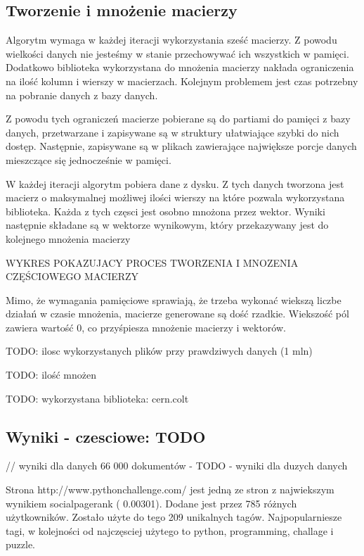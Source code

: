 \subsection{Tworzenie i mnożenie macierzy}

Algorytm wymaga w każdej iteracji wykorzystania sześć macierzy. Z powodu wielkości danych nie jesteśmy w stanie przechowywać ich wszystkich w pamięci. Dodatkowo biblioteka wykorzystana do mnożenia macierzy nakłada ograniczenia na ilość kolumn i wierszy w macierzach. Kolejnym problemem jest czas potrzebny na pobranie danych z bazy danych.

Z powodu tych ograniczeń macierze pobierane są do partiami do pamięci z bazy danych, przetwarzane i zapisywane są w struktury ułatwiające szybki do nich dostęp. Następnie, zapisywane są w plikach zawierające największe porcje danych mieszczące się jednocześnie w pamięci.

W każdej iteracji algorytm pobiera dane z dysku. Z tych danych tworzona jest macierz o maksymalnej możliwej ilości wierszy na które pozwala wykorzystana biblioteka. Każda z tych częsci jest osobno mnożona przez wektor. Wyniki następnie składane są w wektorze wynikowym, który przekazywany jest do kolejnego mnożenia macierzy

WYKRES POKAZUJACY PROCES TWORZENIA I MNOZENIA CZĘŚCIOWEGO MACIERZY



Mimo, że wymagania pamięciowe sprawiają, że trzeba wykonać wiekszą liczbe działań w czasie mnożenia, macierze generowane są dość rzadkie. Wiekszość pól zawiera wartość 0, co przyśpiesza mnożenie macierzy i wektorów.

TODO: ilosc wykorzystanych plików przy prawdziwych danych (1 mln)

TODO: ilość mnożen 

TODO: wykorzystana biblioteka: cern.colt


\subsection{Wyniki - czesciowe: TODO}

// wyniki dla danych 66 000 dokumentów - TODO - wyniki dla duzych danych

Strona http://www.pythonchallenge.com/ jest jedną ze stron z najwiekszym wynikiem socialpagerank ( 0.00301). Dodane jest przez 785 różnych użytkowników. Zostało użyte do tego 209 unikalnych tagów. Najpopularniesze tagi, w kolejności od najczęsciej użytego to python, programming, challage i puzzle.

